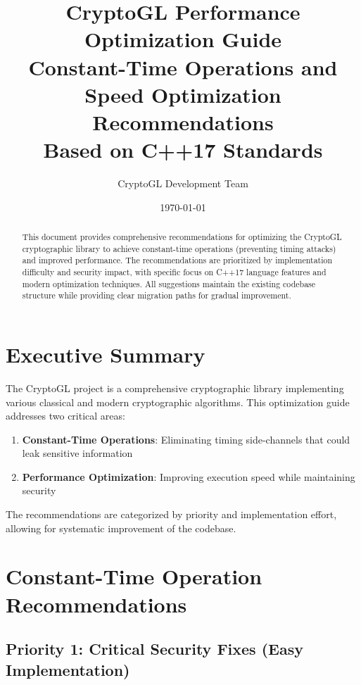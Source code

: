 \documentclass[11pt,a4paper]{article}
\begin{document}
\title{\Huge\textbf{CryptoGL Performance Optimization Guide}\\[0.5cm]
\Large Constant-Time Operations and Speed Optimization Recommendations\\
\large Based on C++17 Standards}
\author{CryptoGL Development Team}
\date{\today}

\maketitle

\begin{abstract}
This document provides comprehensive recommendations for optimizing the CryptoGL cryptographic library to achieve constant-time operations (preventing timing attacks) and improved performance. The recommendations are prioritized by implementation difficulty and security impact, with specific focus on C++17 language features and modern optimization techniques. All suggestions maintain the existing codebase structure while providing clear migration paths for gradual improvement.
\end{abstract}

\tableofcontents
\newpage

\section{Executive Summary}

The CryptoGL project is a comprehensive cryptographic library implementing various classical and modern cryptographic algorithms. This optimization guide addresses two critical areas:

\begin{enumerate}
    \item \textbf{Constant-Time Operations}: Eliminating timing side-channels that could leak sensitive information
    \item \textbf{Performance Optimization}: Improving execution speed while maintaining security
\end{enumerate}

The recommendations are categorized by priority and implementation effort, allowing for systematic improvement of the codebase.

\section{Constant-Time Operation Recommendations}

\subsection{Priority 1: Critical Security Fixes (Easy Implementation)}
\end{document}
